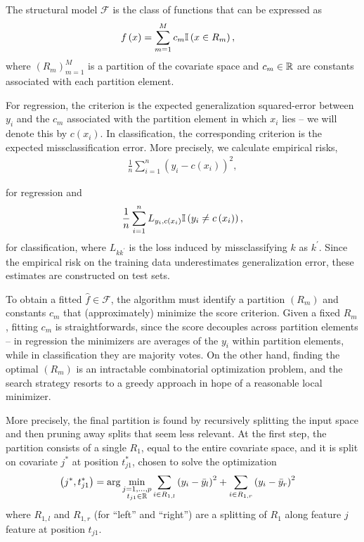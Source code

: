 The structural model $\mathcal{F}$ is the class of functions that can be
expressed as
\begin{align*}
f\left(x\right) &= \sum_{m = 1}^{M} c_{m} \mathbb{I}\left({x \in R_{m}}\right),
\end{align*}
where $\left(R_{m}\right)_{m = 1}^{M}$ is a partition of the covariate space
and $c_{m} \in \mathbb{R}$ are constants associated with each partition element.

For regression, the criterion is the expected generalization squared-error
between $y_{i}$ and the $c_{m}$ associated with the partition element in which
$x_i$ lies -- we will denote this by $c\left(x_{i}\right)$. In classification,
the corresponding criterion is the expected missclassification error. More
precisely, we calculate empirical risks,
\begin{align*}
  \frac{1}{n} \sum_{i = 1}^{n} \left(y_{i} - c\left(x_{i}\right)\right)^{2},
\end{align*}

for regression and
\begin{align*}
  \frac{1}{n} \sum_{i = 1}^{n} L_{y_{i}, c\left(x_{i}\right)} \mathbb{I}\left({y_{i} \neq c\left(x_{i}\right)}\right),
\end{align*}
for classification, where $L_{kk^{\prime}}$ is the loss induced by
missclassifying $k$ as $k^{\prime}$. Since the empirical risk on the training
data underestimates generalization error, these estimates are constructed on
test sets.

To obtain a fitted $\hat{f} \in \mathcal{F}$, the algorithm must identify a
partition $\left(R_{m}\right)$ and constants $c_{m}$ that (approximately)
minimize the score criterion. Given a fixed $R_{m}$, fitting $c_{m}$ is
straightforwards, since the score decouples across partition elements -- in
regression the minimizers are averages of the $y_{i}$ within partition elements,
while in classification they are majority votes. On the other hand, finding the
optimal $\left(R_{m}\right)$ is an intractable combinatorial optimization
problem, and the search strategy resorts to a greedy approach in hope of a
reasonable local minimizer.

More precisely, the final partition is found by recursively splitting the input
space and then pruning away splits that seem less relevant. At the first step,
the partition consists of a single $R_{1}$, equal to the entire covariate space,
and it is split on covariate $j^{\ast}$ at position $t_{j1}^{\ast}$, chosen to
solve the optimization
\begin{align*}
  \left(j^{\ast}, t_{j1}^{\ast}\right) &= \arg \min_{\substack{j = 1, \dots, p \\ t_{j1} \in \mathbb{R}}} \sum_{i \in R_{1, l}} \left(y_{i} - \bar{y}_{l}\right)^{2} + \sum_{i \in R_{1, r}} \left(y_{i} - \bar{y}_{r}\right)^{2}
\end{align*}
where $R_{1, l}$ and $R_{1, r}$ (for ``left'' and ``right'') are a splitting of
$R_{1}$ along feature $j$ feature at position $t_{j1}$.

